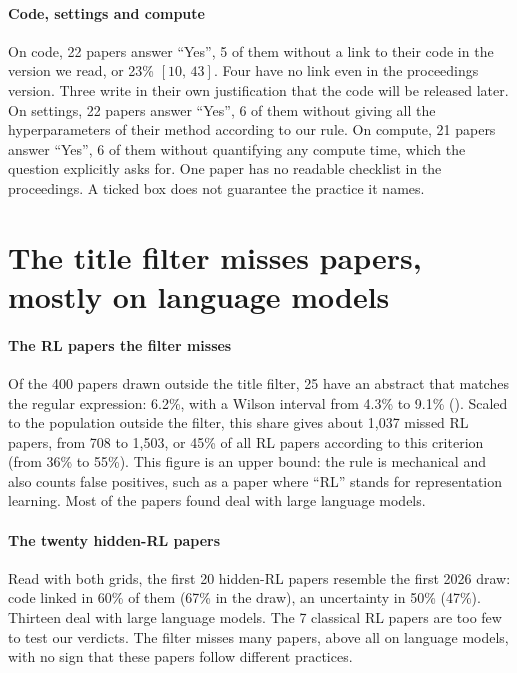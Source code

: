 \paragraph{Code, settings and compute}
On code, 22 papers answer \enquote{Yes}, 5 of them without a link to their code in the version we
read, or 23\% $[10,\,43]$. Four have no link even in the proceedings version. Three write in their own
justification that the code will be released later. On settings, 22 papers answer
\enquote{Yes}, 6 of them without giving all the hyperparameters of their method according to our rule.
On compute, 21 papers answer \enquote{Yes}, 6 of them without quantifying any compute time, which the
question explicitly asks for. One paper has no readable checklist in the proceedings. A ticked box does
not guarantee the practice it names.

\section{The title filter misses papers, mostly on language models}\label{sec:sr-filtre}

\paragraph{The RL papers the filter misses}
Of the 400 papers drawn outside the title filter, 25 have an abstract that matches the regular
expression: 6.2\%, with a Wilson interval from 4.3\% to 9.1\% ().
Scaled to the population outside the filter, this share gives about 1,037 missed RL papers, from
708 to 1,503, or 45\% of all RL papers according to this criterion (from 36\% to 55\%). This figure
is an upper bound: the rule is mechanical and also counts false positives, such as a paper where
\enquote{RL} stands for representation learning. Most of the papers found deal with large language
models.

\paragraph{The twenty hidden-RL papers}
Read with both grids, the first 20 hidden-RL papers resemble the first 2026 draw: code linked in 60\%
of them (67\% in the draw), an uncertainty in 50\% (47\%). Thirteen deal with large language models.
The 7 classical RL papers are too few to test our verdicts. The filter misses many papers, above all on
language models, with no sign that these papers follow different practices.

